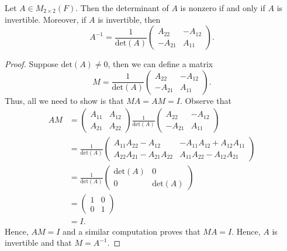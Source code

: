 \begin{theorem}
    Let \( A \in {M}_{2 \times 2}(F) \). Then the determinant of \( A  \) is nonzero if and only if \( A  \) is invertible. Moreover, if \( A  \) is invertible, then
    \[  A^{-1} = \frac{ 1 }{ \text{det}(A) } \begin{pmatrix}
        {A}_{22} & - {A}_{12} \\
        - {A}_{21} & {A}_{11}
    \end{pmatrix}. \]
\end{theorem}
\begin{proof}
Suppose \( \text{det}(A) \neq  0  \), then we can define a matrix
\[  M = \frac{ 1 }{ \text{det}(A) }  \begin{pmatrix}
    {A}_{22} & - {A}_{12} \\
    - {A}_{21} & {A}_{11}
\end{pmatrix}. \]
Thus, all we need to show is that \( MA = AM = I  \). Observe that
\begin{align*}
    AM &= \begin{pmatrix}
        {A}_{11} & {A}_{12} \\
        {A}_{21} & {A}_{22} 
    \end{pmatrix} \frac{ 1 }{ \text{det}(A) }  \begin{pmatrix}
        {A}_{22} & - {A}_{12} \\
        - {A}_{21} & {A}_{11}
    \end{pmatrix} \\
       &= \frac{ 1 }{ \text{det}(A) } \begin{pmatrix}
            {A}_{11} {A}_{22} - {A}_{12} & - {A}_{11}{A}_{12} + {A}_{12} {A}_{11} \\
            {A}_{22} {A}_{21} - {A}_{21}{A}_{22} & {A}_{11} {A}_{22} - {A}_{12} {A}_{21}
       \end{pmatrix} \\
       &= \frac{ 1 }{ \text{det}(A) }  \begin{pmatrix}
           \text{det}(A) & 0 \\ 
           0 & \text{det}(A) 
       \end{pmatrix} \\
       &= \begin{pmatrix}
           1 & 0 \\ 
           0 & 1 
       \end{pmatrix} \\
       &= I.
\end{align*}
Hence, \( AM = I  \) and a similar computation proves that \( MA = I  \). Hence, \( A  \) is invertible and that \( M = A^{-1} \).


\end{proof}
